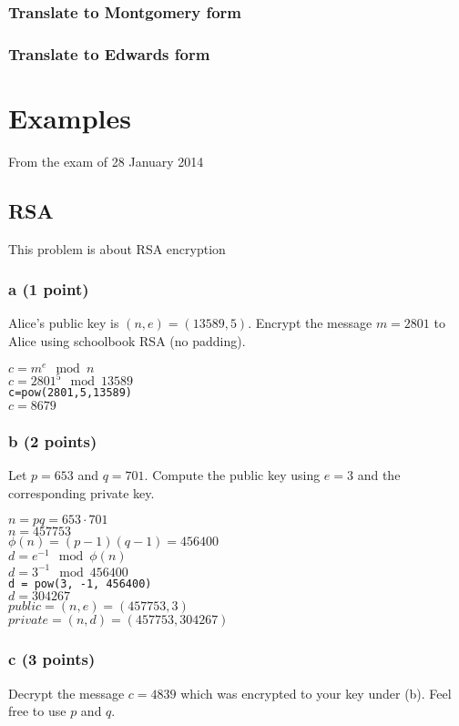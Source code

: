 \documentclass{article}
\begin{document}
\subsubsection{Translate to Montgomery form}
\subsubsection{Translate to Edwards form}

\section{Examples}
From the exam of 28 January 2014
\subsection{RSA}
This problem is about RSA encryption

\subsubsection{a (1 point)}
Alice's public key is $(n, e) = (13589, 5)$. Encrypt the
message $m = 2801$ to Alice using schoolbook RSA (no padding).

$c=m^e \mod n$ \\
$c=2801^5 \mod 13589$ \\
\verb|c=pow(2801,5,13589)| \\
$c=8679$

\subsubsection{b (2 points)}
Let $p = 653$ and $q = 701$. Compute the public key
using $e = 3$ and the corresponding private key.

$n = pq = 653 \cdot 701$ \\
$n = 457753$ \\
$\phi(n) = (p-1)(q-1) = 456400$ \\
$d = e^{-1} \mod \phi(n)$ \\
$d = 3^{-1} \mod 456400$ \\
\verb|d = pow(3, -1, 456400)| \\
$d = 304267$ \\

$public = (n,e) = (457753, 3)$ \\
$private = (n,d)= (457753, 304267)$ \\


\subsubsection{c (3 points)}
Decrypt the message $c = 4839$ which was encrypted to your key under (b). Feel
free to use $p$ and $q$.
\end{document}
